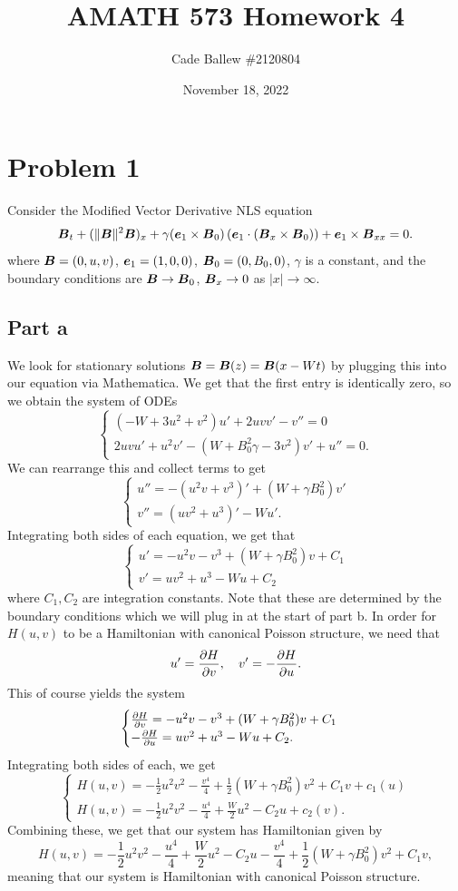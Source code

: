\documentclass{article}
\title{AMATH 573 Homework 4}
\author{Cade Ballew \#2120804}
\date{November 18, 2022}
\newcommand{\mbf}[1]{\mbox{\boldmath {$#1$}}}
\begin{document}
	
\maketitle
	
\section{Problem 1}
Consider the Modified Vector Derivative NLS equation
$$
\mbf{B}_t+(\|\mbf{B}\|^2\mbf{B})_x+\gamma (\mbf{e}_1\times
\mbf{B}_0)\left(\mbf{e}_1\cdot (\mbf{B}_x\times
\mbf{B}_0)\right)+\mbf{e}_1\times \mbf{B}_{xx}=0.
$$
where $\mbf{B}=(0,u,v)$, $\mbf{e}_1=(1,0,0)$,
$\mbf{B}_0=(0,B_0,0)$, $\gamma$ is a constant, and the boundary conditions are
$\mbf{B}\rightarrow \mbf{B}_0$, $\mbf{B}_x \rightarrow 0$ as $|x|\rightarrow
\infty$.
\subsection{Part a}
We look for stationary solutions $\mbf{B}=\mbf{B}(z)=\mbf{B}(x-W t)$ by plugging this into our equation via Mathematica. We get that the first entry is identically zero, so we obtain the system of ODEs
\[
\begin{cases}
(-W+3u^2+v^2)u'+2uvv'-v''=0\\
2uvu'+u^2v'-(W+B_0^2\gamma-3v^2)v'+u''=0.
\end{cases}
\]
We can rearrange this and collect terms to get
\[
\begin{cases}
u''=-(u^2v+v^3)'+(W+\gamma B_0^2)v'\\
v''=(uv^2+u^3)'-Wu'.
\end{cases}
\]
Integrating both sides of each equation, we get that
\[
\begin{cases}
u'=-u^2v-v^3+(W+\gamma B_0^2)v+C_1\\
v'=uv^2+u^3-Wu+C_2
\end{cases}
\]
where $C_1,C_2$ are integration constants. Note that these are determined by the boundary conditions which we will plug in at the start of part b. In order for $H(u,v)$ to be a Hamiltonian with canonical Poisson structure, we need that
\[
u'=\frac{\partial H}{\partial v},\quad v'=-\frac{\partial H}{\partial u}.
\]
This of course yields the system
\[
\begin{cases}
	\frac{\partial H}{\partial v}=-u^2v-v^3+(W+\gamma B_0^2)v+C_1\\
	-\frac{\partial H}{\partial u}=uv^2+u^3-Wu+C_2.
\end{cases}
\]
Integrating both sides of each, we get
\[
\begin{cases}
	H(u,v)=-\frac{1}{2} u^2v^2-\frac{v^4}{4}+\frac{1}{2}(W+\gamma B_0^2)v^2+C_1v+c_1(u)\\
	H(u,v)=-\frac{1}{2} u^2v^2-\frac{u^4}{4}+\frac{W}{2}u^2-C_2u+c_2(v).
\end{cases}
\]
Combining these, we get that our system has Hamiltonian given by
\[
H(u,v)=-\frac{1}{2} u^2v^2-\frac{u^4}{4}+\frac{W}{2}u^2-C_2u-\frac{v^4}{4}+\frac{1}{2}(W+\gamma B_0^2)v^2+C_1v,
\]
meaning that our system is Hamiltonian with canonical Poisson structure.
\end{document}

